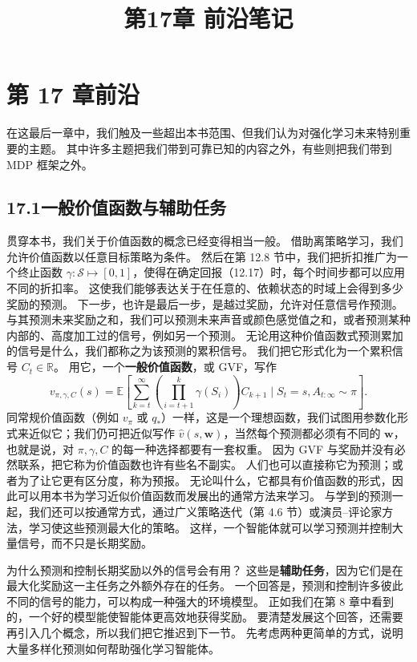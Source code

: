 \documentclass[UTF8,12pt,a4paper,fontset=fandol]{ctexart}
\title{第17章 前沿笔记}
\author{}
\date{}
\begin{document}
\maketitle

\section*{第 17 章\quad 前沿}

在这最后一章中，我们触及一些超出本书范围、但我们认为对强化学习未来特别重要的主题。
其中许多主题把我们带到可靠已知的内容之外，有些则把我们带到 MDP 框架之外。

\subsection*{17.1\quad 一般价值函数与辅助任务}

贯穿本书，我们关于价值函数的概念已经变得相当一般。
借助离策略学习，我们允许价值函数以任意目标策略为条件。
然后在第 12.8 节中，我们把折扣推广为一个终止函数 $\gamma:\mathcal{S}\mapsto[0,1]$，使得在确定回报（12.17）时，每个时间步都可以应用不同的折扣率。
这使我们能够表达关于在任意的、依赖状态的时域上会得到多少奖励的预测。
下一步，也许是最后一步，是越过奖励，允许对任意信号作预测。
与其预测未来奖励之和，我们可以预测未来声音或颜色感觉值之和，或者预测某种内部的、高度加工过的信号，例如另一个预测。
无论用这种价值函数式预测累加的信号是什么，我们都称之为该预测的累积信号。
我们把它形式化为一个累积信号 $C_t\in\mathbb{R}$。
用它，一个\textbf{一般价值函数}，或 GVF，写作
\begin{equation}
v_{\pi,\gamma,C}(s)=
\mathbb{E}\left[
\sum_{k=t}^{\infty}
\left(\prod_{i=t+1}^{k}\gamma(S_i)\right)C_{k+1}
\mid S_t=s,A_{t:\infty}\sim\pi
\right].
\tag{17.1}
\end{equation}
同常规价值函数（例如 $v_\pi$ 或 $q_*$）一样，这是一个理想函数，我们试图用参数化形式来近似它；我们仍可把近似写作 $\hat v(s,\mathbf{w})$，当然每个预测都必须有不同的 $\mathbf{w}$，也就是说，对 $\pi,\gamma,C$ 的每一种选择都要有一套权重。
因为 GVF 与奖励并没有必然联系，把它称为价值函数也许有些名不副实。
人们也可以直接称它为预测；或者为了让它更有区分度，称为预报。
无论叫什么，它都具有价值函数的形式，因此可以用本书为学习近似价值函数而发展出的通常方法来学习。
与学到的预测一起，我们还可以按通常方式，通过广义策略迭代（第 4.6 节）或演员--评论家方法，学习使这些预测最大化的策略。
这样，一个智能体就可以学习预测并控制大量信号，而不只是长期奖励。

为什么预测和控制长期奖励以外的信号会有用？
这些是\textbf{辅助任务}，因为它们是在最大化奖励这一主任务之外额外存在的任务。
一个回答是，预测和控制许多彼此不同的信号的能力，可以构成一种强大的环境模型。
正如我们在第 8 章中看到的，一个好的模型能使智能体更高效地获得奖励。
要清楚发展这个回答，还需要再引入几个概念，所以我们把它推迟到下一节。
先考虑两种更简单的方式，说明大量多样化预测如何帮助强化学习智能体。
\end{document}
